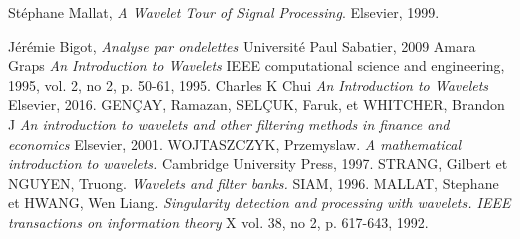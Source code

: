 \begin{thebibliography}{1}
	  Stéphane Mallat,
	  \emph{A Wavelet Tour of Signal Processing}.
	  Elsevier, 
	  1999.
	  
	Jérémie Bigot,
	\emph{Analyse par ondelettes}
	Université Paul Sabatier,
	2009		  
	Amara Graps
	\emph{An Introduction to Wavelets}
	 IEEE computational science and engineering, 1995, vol. 2, no 2, p. 50-61,
	 1995.
		Charles K Chui
      	\emph{An Introduction to Wavelets}
      	 Elsevier, 2016.
	GENÇAY, Ramazan, SELÇUK, Faruk, et WHITCHER, Brandon J
	 \emph{An introduction to wavelets and other filtering methods in finance and economics} 			      Elsevier, 2001.
  WOJTASZCZYK, Przemyslaw. 
  \emph{A mathematical introduction to wavelets.}
   Cambridge University Press, 1997.
	STRANG, Gilbert et NGUYEN, Truong.
	\emph{Wavelets and filter banks.}
	 SIAM, 1996.
MALLAT, Stephane et HWANG, Wen Liang.
\emph{Singularity detection and processing with wavelets. IEEE transactions on information theory} X vol. 38, no 2, p. 617-643, 1992.   
   
\end{thebibliography}